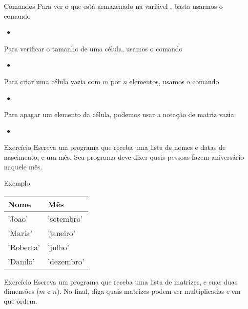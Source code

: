\documentclass[hyperref={pdfpagelabels=false}]{beamer}
\begin{document}
\begin{frame}{Comandos}
   Para ver o que está armazenado na variável , basta usarmos o comando
   \begin{itemize}
      \item[\ttfamily{>>}] 
   \end{itemize}
   Para verificar o tamanho de uma célula, usamos o comando
   \begin{itemize}
      \item[\ttfamily{>>}] 
   \end{itemize}
   Para criar uma célula vazia com $m$ por $n$ elementos, usamos o comando
   \begin{itemize}
      \item[\ttfamily{>>}] 
   \end{itemize}
   Para apagar um elemento da célula, podemos usar a notação de matriz vazia:
   \begin{itemize}
      \item[\ttfamily{>>}] 
   \end{itemize}
\end{frame}

\begin{frame}{Exercício}
   Escreva um programa que receba uma lista de nomes e datas de nascimento, e um mês. Seu programa deve dizer quais pessoas fazem aniversário naquele mês.

   Exemplo:\\
   \begin{center}
   \begin{tabular}{l l}
      Nome & Mês\\\toprule
      'Joao' & 'setembro'\\
      'Maria' & 'janeiro'\\
      'Roberta' & 'julho'\\
      'Danilo' & 'dezembro'
   \end{tabular}
   \end{center}
   \vfill
   \begin{center}
     \href{listings/aniversarios.m}{\underline{}}
   \end{center}
\end{frame}

\begin{frame}{Exercício}
   Escreva um programa que receba uma lista de matrizes, e suas duas dimensões ($m$ e $n$). No final, diga quais matrizes podem ser multiplicadas e em que ordem.
   \vfill
   \begin{center}
     \href{listings/podemmultiplicar.m}{\underline{}}
   \end{center}
\end{frame}
\end{document}

